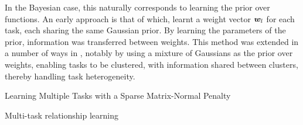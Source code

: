In the Bayesian case, this naturally corresponds to learning the prior over functions. An early approach is that of \cite{Allenby1999} which, learnt a weight vector $\bm w_l$ for each task, each sharing the same Gaussian prior. By learning the parameters of the prior, information was transferred between weights. This method was extended in a number of ways in \cite{BakkerHeskes2003}, notably by using a mixture of Gaussians as the prior over weights, enabling tasks to be clustered, with information shared between clusters, thereby handling task heterogeneity.


Learning Multiple Tasks with a Sparse Matrix-Normal Penalty\cite{Zhang2010a}

Multi-task relationship learning\cite{Zhang2012mtrl}


